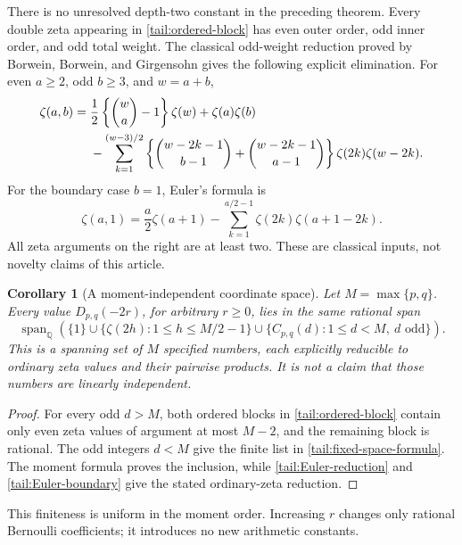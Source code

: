 \documentclass[11pt,a4paper]{article}
\numberwithin{equation}{section}
\newtheorem{corollary}[theorem]{Corollary}
\theoremstyle{definition}
\theoremstyle{remark}
\begin{document}
There is no unresolved depth-two constant in the preceding theorem.
Every double zeta appearing in \eqref{tail:ordered-block} has even
outer order, odd inner order, and odd total weight. The classical
odd-weight reduction proved by Borwein, Borwein, and Girgensohn
\cite{BBG} gives the following explicit elimination. For even
\(a\ge2\), odd \(b\ge3\), and \(w=a+b\),
\begin{align}\label{tail:Euler-reduction}
 \zeta(a,b)={}&\frac12\left\{\binom wa-1\right\}\zeta(w)
              +\zeta(a)\zeta(b)\notag\\
 &-\sum_{k=1}^{(w-3)/2}
 \left\{\binom{w-2k-1}{b-1}+\binom{w-2k-1}{a-1}\right\}
                 \zeta(2k)\zeta(w-2k).
\end{align}
For the boundary case \(b=1\), Euler's formula is
\begin{equation}\label{tail:Euler-boundary}
 \zeta(a,1)=\frac a2\zeta(a+1)
            -\sum_{k=1}^{a/2-1}\zeta(2k)\zeta(a+1-2k).
\end{equation}
All zeta arguments on the right are at least two. These are classical
inputs, not novelty claims of this article.

\begin{corollary}[A moment-independent coordinate space]
\label{tail:fixed-space}
Let \(M=\max\{p,q\}\). Every value \(D_{p,q}(-2r)\), for
arbitrary \(r\ge0\), lies in the same rational span
\begin{equation}\label{tail:fixed-space-formula}
 \operatorname{span}_{\mathbb Q}
 \left(\{1\}\cup
       \{\zeta(2h):1\le h\le M/2-1\}\cup
       \{C_{p,q}(d):1\le d<M,\ d\text{ odd}\}\right).
\end{equation}
This is a spanning set of \(M\) specified numbers, each explicitly
reducible to ordinary zeta values and their pairwise products.
It is not a claim that those numbers are linearly independent.
\end{corollary}

\begin{proof}
For every odd \(d>M\), both ordered blocks in
\eqref{tail:ordered-block} contain only even zeta values of argument
at most \(M-2\), and the remaining block is rational. The odd
integers \(d<M\) give the finite list in
\eqref{tail:fixed-space-formula}. The moment formula proves the
inclusion, while \eqref{tail:Euler-reduction} and
\eqref{tail:Euler-boundary} give the stated ordinary-zeta reduction.
\end{proof}

This finiteness is uniform in the moment order. Increasing \(r\)
changes only rational Bernoulli coefficients; it introduces no new
arithmetic constants.
\end{document}
